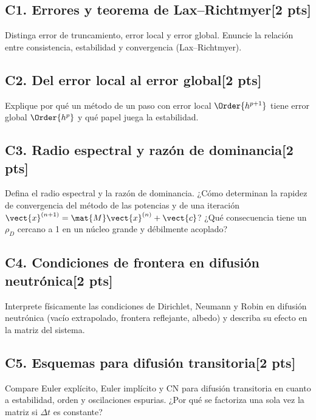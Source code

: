 
\subsection*{C1. Errores y teorema de Lax--Richtmyer\hfill[2 pts]}
Distinga error de truncamiento, error local y error global. Enuncie la relación entre
consistencia, estabilidad y convergencia (Lax--Richtmyer).
\respuesta{}

\subsection*{C2. Del error local al error global\hfill[2 pts]}
Explique por qué un método de un paso con error local $\Order{h^{p+1}}$ tiene error global
$\Order{h^p}$ y qué papel juega la estabilidad.
\respuesta{}

\subsection*{C3. Radio espectral y razón de dominancia\hfill[2 pts]}
Defina el radio espectral y la razón de dominancia. ¿Cómo determinan la rapidez de convergencia
del método de las potencias y de una iteración $\vect{x}^{(n+1)} = \mat{M}\vect{x}^{(n)} + \vect{c}$?
¿Qué consecuencia tiene un $\rho_D$ cercano a 1 en un núcleo grande y débilmente acoplado?
\respuesta{}

\subsection*{C4. Condiciones de frontera en difusión neutrónica\hfill[2 pts]}
Interprete físicamente las condiciones de Dirichlet, Neumann y Robin en difusión neutrónica
(vacío extrapolado, frontera reflejante, albedo) y describa su efecto en la matriz del sistema.
\respuesta{}

\subsection*{C5. Esquemas para difusión transitoria\hfill[2 pts]}
Compare Euler explícito, Euler implícito y CN para difusión transitoria en cuanto a estabilidad,
orden y oscilaciones espurias. ¿Por qué se factoriza una sola vez la matriz si $\Delta t$ es constante?
\respuesta{}
